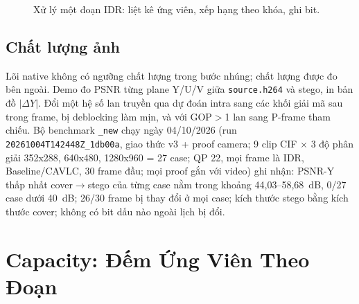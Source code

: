 \documentclass[11pt,a4paper]{article}
\begin{document}
\begin{figure}[H]
\centering
{}
\caption{Xử lý một đoạn IDR: liệt kê ứng viên, xếp hạng theo khóa, ghi bit.}
\label{fig:position-pipeline}
\end{figure}

\subsection{Chất lượng ảnh}

Lõi native không có ngưỡng chất lượng trong bước nhúng; chất lượng được đo bên ngoài.
Demo đo PSNR từng plane Y/U/V giữa \texttt{source.h264} và stego, in bản đồ
\(|\Delta Y|\). Đổi một hệ số lan truyền qua dự đoán intra sang các khối giải mã
sau trong frame, bị deblocking làm mịn, và với GOP\(>\)1 lan sang P-frame tham chiếu.
Bộ benchmark \texttt{\_new} chạy ngày 04/10/2026 (run
\texttt{20261004T142448Z\_1db00a}, giao thức v3 + proof camera; 9 clip CIF \(\times\)
3 độ phân giải 352x288, 640x480, 1280x960 = 27 case; QP 22, mọi frame là IDR,
Baseline/CAVLC, 30 frame đầu; mọi proof gắn với video) ghi nhận: PSNR-Y thấp nhất
cover\(\rightarrow\)stego của từng case nằm trong khoảng 44{,}03--58{,}68~dB, 0/27
case dưới 40~dB; 26/30 frame bị thay đổi ở mọi case; kích thước stego bằng kích thước
cover; không có bit dấu nào ngoài lịch bị đổi.

\section{Capacity: Đếm Ứng Viên Theo Đoạn}
\end{document}

